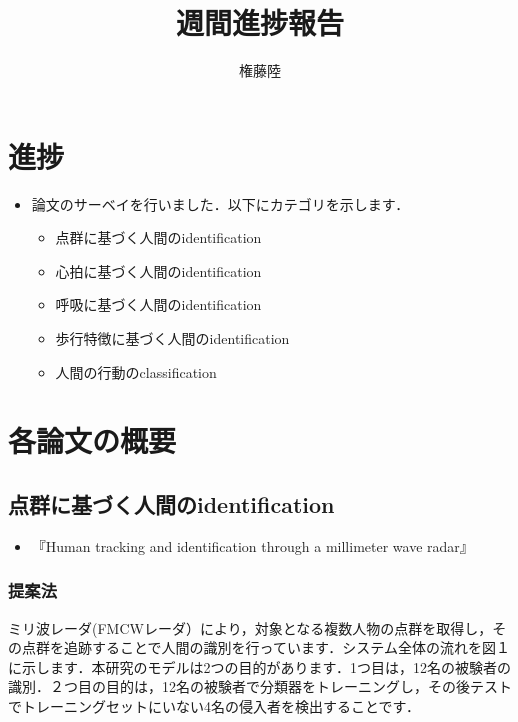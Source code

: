 \documentclass[dvipdfmx]{jsarticle}
\begin{document}
\title{週間進捗報告}
\author{権藤陸}
\maketitle
\section{進捗}
\begin{itemize}
    \item 論文のサーベイを行いました．以下にカテゴリを示します．
    \begin{itemize}
        \item 点群に基づく人間のidentification
        \item 心拍に基づく人間のidentification
        \item 呼吸に基づく人間のidentification
        \item 歩行特徴に基づく人間のidentification
        \item 人間の行動のclassification
    \end{itemize}
\end{itemize}

\section{各論文の概要}
\subsection{点群に基づく人間のidentification}
\begin{itemize}
    \item 『Human tracking and identification through a millimeter wave radar\cite{pointcloud}』
\end{itemize}

\subsubsection{提案法}
ミリ波レーダ(FMCWレーダ）により，対象となる複数人物の点群を取得し，その点群を追跡することで人間の識別を行っています．システム全体の流れを図１に示します．本研究のモデルは2つの目的があります．1つ目は，12名の被験者の識別．２つ目の目的は，12名の被験者で分類器をトレーニングし，その後テストでトレーニングセットにいない4名の侵入者を検出することです．
\end{document}
